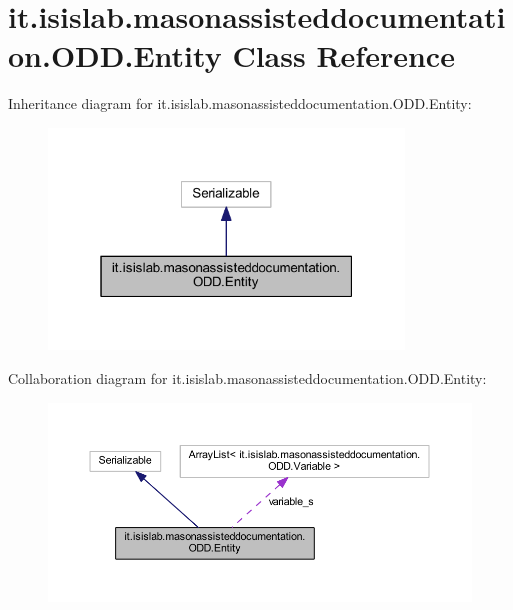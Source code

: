\hypertarget{classit_1_1isislab_1_1masonassisteddocumentation_1_1_o_d_d_1_1_entity}{\section{it.\-isislab.\-masonassisteddocumentation.\-O\-D\-D.\-Entity Class Reference}
\label{classit_1_1isislab_1_1masonassisteddocumentation_1_1_o_d_d_1_1_entity}
}


Inheritance diagram for it.\-isislab.\-masonassisteddocumentation.\-O\-D\-D.\-Entity\-:\nopagebreak
\begin{figure}[H]
\begin{center}
\leavevmode
\includegraphics[width=268pt]{classit_1_1isislab_1_1masonassisteddocumentation_1_1_o_d_d_1_1_entity__inherit__graph}
\end{center}
\end{figure}


Collaboration diagram for it.\-isislab.\-masonassisteddocumentation.\-O\-D\-D.\-Entity\-:\nopagebreak
\begin{figure}[H]
\begin{center}
\leavevmode
\includegraphics[width=350pt]{classit_1_1isislab_1_1masonassisteddocumentation_1_1_o_d_d_1_1_entity__coll__graph}
\end{center}
\end{figure}
